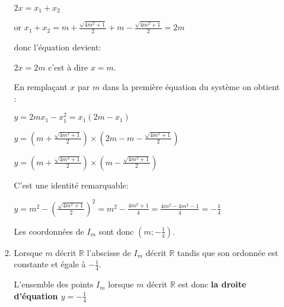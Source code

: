 \begin{corrige}
\begin{enumerate}
\begin{enumerate}
                         $2x=x_{1}+x_{2}$
                         \par
                         or $x_{1}+x_{2}=m+\frac{\sqrt{4m^{2}+1}}{2}+m-\frac{\sqrt{4m^{2}+1}}{2}=2m$
                         \par
                         donc l'équation devient:
                         \par
                         $2x=2m$ c'est à dire $x=m$.
                         \par
                         En remplaçant $x$ par $m$ dans la première équation du système on obtient :
                         \par
                         $y=2mx_{1}-x_{1}^{2}=x_{1}\left(2m-x_{1}\right)$
                         \par
                         $y=\left(m+\frac{\sqrt{4m^{2}+1}}{2}\right)\times \left(2m-m-\frac{\sqrt{4m^{2}+1}}{2}\right)$
                         \par
                         $y=\left(m+\frac{\sqrt{4m^{2}+1}}{2}\right)\times \left(m-\frac{\sqrt{4m^{2}+1}}{2}\right)$
                         \par
                         C'est une identité remarquable:
                         \par
                         $y=m^{2}-\left(\frac{\sqrt{4m^{2}+1}}{2}\right)^{2}=m^{2}-\frac{4m^{2}+1}{4}=\frac{4m^{2}-4m^{2}-1}{4}=-\frac{1}{4}$
                         \par
                         Les coordonnées de $I_{m}$ sont donc $\left(m;-\frac{1}{4}\right)$.
                         \item
                         Lorsque $m$ décrit $\mathbb{R}$ l'abscisse de $I_{m}$ décrit $\mathbb{R}$ tandis que son ordonnée est constante et égale à $-\frac{1}{4}$.
                         \par
                         L'ensemble des points $I_{m}$ lorsque $m$ décrit $\mathbb{R}$ est donc \textbf{la droite d'équation $y=-\frac{1}{4}$}
                    \end{enumerate}
               \end{enumerate}
          \end{corrige}
